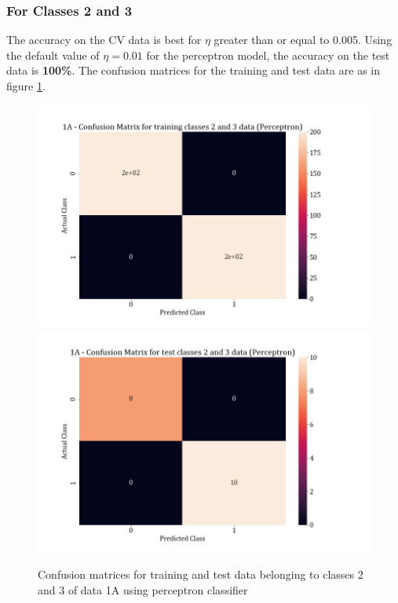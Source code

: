 \documentclass[11pt,a4paper]{article}
\begin{document}
\subsubsection{For Classes 2 and 3}

The accuracy on the CV data is best for $\eta$ greater than or equal to 0.005. Using the default value of $\eta = 0.01$ for the perceptron model, the accuracy on the test data is \textbf{100\%}. The confusion matrices for the training and test data are as in figure \ref{fig:perc_conf_23}.
\begin{figure}[H]
    \centering
    \includegraphics[scale=0.27]{images/perceptron_training classes 2 and 3_confmat.png}
    \includegraphics[scale = 0.27]{images/perceptron_test classes 2 and 3_confmat.png}
    \caption{Confusion matrices for training and test data belonging to classes 2 and 3 of data 1A using perceptron classifier}
    \label{fig:perc_conf_23}
\end{figure}
\end{document}
